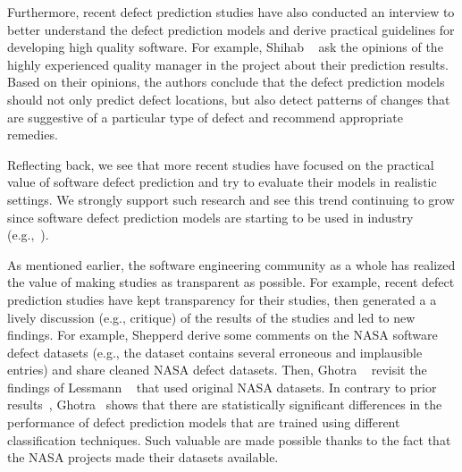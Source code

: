 Furthermore, recent defect prediction studies have also conducted an interview to better understand the defect prediction models and derive practical guidelines for developing high quality software. For example, Shihab \ea ~\cite{Shihab2011FSE} ask the opinions of the highly experienced quality manager in the project about their prediction results. Based on their opinions, the authors conclude that the defect prediction models should not only predict defect locations, but also detect patterns of changes that are suggestive of a particular type of defect and recommend appropriate remedies. 


Reflecting back, we see that more recent studies have focused on the practical value of software defect prediction and try to evaluate their models in realistic settings. We strongly support such research and see this trend continuing to grow since software defect prediction models are starting to be used in industry (e.g.,~\cite{Shihab2011FSE}).


As mentioned earlier, the software engineering community as a whole has realized the value of making studies as transparent as possible. For example, recent defect prediction studies have kept transparency for their studies, then generated a  a lively discussion (e.g., critique) of the results of the studies and led to new findings.
For example, Shepperd \ea \cite{Shepperd2013TSE} derive some comments on the NASA software defect datasets (e.g., the dataset contains several erroneous and implausible entries) and share cleaned NASA defect datasets. Then, Ghotra \ea ~\cite{Ghotra2015ICSE} revisit the findings of Lessmann \ea ~\cite{Lessmann2008TSE} that used original NASA datasets. In contrary to prior results~\cite{Lessmann2008TSE}, Ghotra \ea ~shows that there are statistically significant differences in the performance of defect prediction models that are trained using different classification techniques. Such valuable are made possible thanks to the fact that the NASA projects made their datasets available.  

